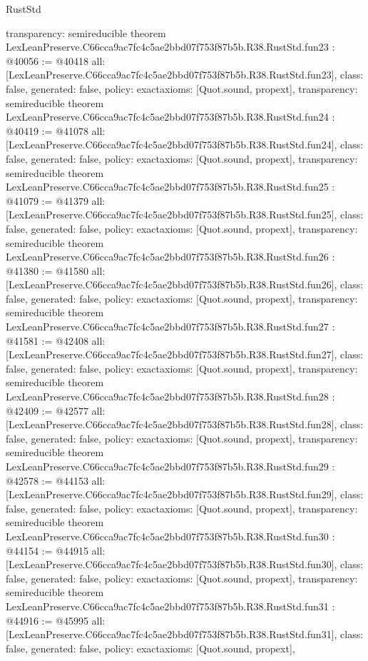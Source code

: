 \begin{lexlean}{RustStd}
\begin{coremodule}
{  transparency: semireducible
}
theorem LexLeanPreserve.C66cca9ac7fc4c5ae2bbd07f753f87b5b.R38.RustStd.fun23 : @40056 := @40418 {
  all: [LexLeanPreserve.C66cca9ac7fc4c5ae2bbd07f753f87b5b.R38.RustStd.fun23],
  class: false,
  generated: false,
  policy: exact{axioms: [Quot.sound, propext]},
  transparency: semireducible
}
theorem LexLeanPreserve.C66cca9ac7fc4c5ae2bbd07f753f87b5b.R38.RustStd.fun24 : @40419 := @41078 {
  all: [LexLeanPreserve.C66cca9ac7fc4c5ae2bbd07f753f87b5b.R38.RustStd.fun24],
  class: false,
  generated: false,
  policy: exact{axioms: [Quot.sound, propext]},
  transparency: semireducible
}
theorem LexLeanPreserve.C66cca9ac7fc4c5ae2bbd07f753f87b5b.R38.RustStd.fun25 : @41079 := @41379 {
  all: [LexLeanPreserve.C66cca9ac7fc4c5ae2bbd07f753f87b5b.R38.RustStd.fun25],
  class: false,
  generated: false,
  policy: exact{axioms: [Quot.sound, propext]},
  transparency: semireducible
}
theorem LexLeanPreserve.C66cca9ac7fc4c5ae2bbd07f753f87b5b.R38.RustStd.fun26 : @41380 := @41580 {
  all: [LexLeanPreserve.C66cca9ac7fc4c5ae2bbd07f753f87b5b.R38.RustStd.fun26],
  class: false,
  generated: false,
  policy: exact{axioms: [Quot.sound, propext]},
  transparency: semireducible
}
theorem LexLeanPreserve.C66cca9ac7fc4c5ae2bbd07f753f87b5b.R38.RustStd.fun27 : @41581 := @42408 {
  all: [LexLeanPreserve.C66cca9ac7fc4c5ae2bbd07f753f87b5b.R38.RustStd.fun27],
  class: false,
  generated: false,
  policy: exact{axioms: [Quot.sound, propext]},
  transparency: semireducible
}
theorem LexLeanPreserve.C66cca9ac7fc4c5ae2bbd07f753f87b5b.R38.RustStd.fun28 : @42409 := @42577 {
  all: [LexLeanPreserve.C66cca9ac7fc4c5ae2bbd07f753f87b5b.R38.RustStd.fun28],
  class: false,
  generated: false,
  policy: exact{axioms: [Quot.sound, propext]},
  transparency: semireducible
}
theorem LexLeanPreserve.C66cca9ac7fc4c5ae2bbd07f753f87b5b.R38.RustStd.fun29 : @42578 := @44153 {
  all: [LexLeanPreserve.C66cca9ac7fc4c5ae2bbd07f753f87b5b.R38.RustStd.fun29],
  class: false,
  generated: false,
  policy: exact{axioms: [Quot.sound, propext]},
  transparency: semireducible
}
theorem LexLeanPreserve.C66cca9ac7fc4c5ae2bbd07f753f87b5b.R38.RustStd.fun30 : @44154 := @44915 {
  all: [LexLeanPreserve.C66cca9ac7fc4c5ae2bbd07f753f87b5b.R38.RustStd.fun30],
  class: false,
  generated: false,
  policy: exact{axioms: [Quot.sound, propext]},
  transparency: semireducible
}
theorem LexLeanPreserve.C66cca9ac7fc4c5ae2bbd07f753f87b5b.R38.RustStd.fun31 : @44916 := @45995 {
  all: [LexLeanPreserve.C66cca9ac7fc4c5ae2bbd07f753f87b5b.R38.RustStd.fun31],
  class: false,
  generated: false,
  policy: exact{axioms: [Quot.sound, propext]},
}
\end{coremodule}
\end{lexlean}
